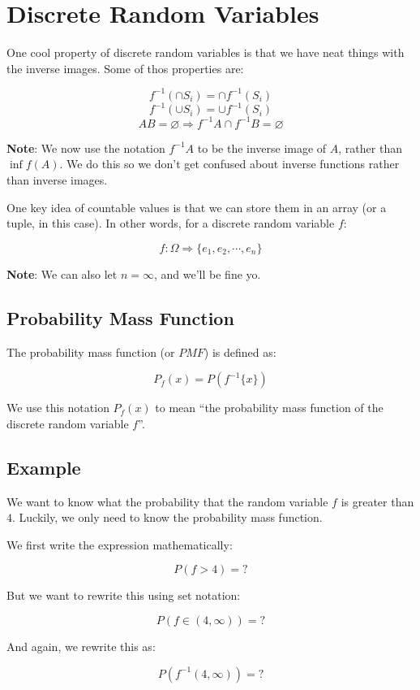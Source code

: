 \documentclass{article}
\newcommand{\inv}[1]{#1^{-1}}
\begin{document}
\section*{Discrete Random Variables}

One cool property of discrete random variables is that we have neat
things with the inverse images. Some of thos properties are:

\[
f^{-1}(\cap S_i)=\cap f^{-1}(S_i)
\] \[
f^{-1}(\cup S_i)=\cup f^{-1}(S_i)
\] \[
AB=\varnothing \Rightarrow f^{-1}A\cap\inv{f}B=\varnothing
\]

\textbf{Note}: We now use the notation $\inv{f}A$ to be the inverse
image of $A$, rather than $\inf{f}(A)$. We do this so we don't get
confused about inverse functions rather than inverse images.

One key idea of countable values is that we can store them in an array
(or a tuple, in this case). In other words, for a discrete random
variable $f$:

\[
f:\Omega\Rightarrow\{e_1,e_2,\cdots,e_n\}
\]

\textbf{Note}: We can also let $n=\infty$, and we'll be fine yo.

\subsection*{Probability Mass Function}

The probability mass function (or $PMF$) is defined as:

\[
P_f(x)=P(\inv{f}\{x\})
\]

We use this notation $P_f(x)$ to mean ``the probability mass function
of the discrete random variable $f$''.

\subsection*{Example}

We want to know what the probability that the random variable $f$ is
greater than $4$. Luckily, we only need to know the probability mass
function.

We first write the expression mathematically:

\[
P(f>4)=?
\]

But we want to rewrite this using set notation:

\[
P(f\in(4,\infty))=?
\]

And again, we rewrite this as:

\[
P(\inv{f}(4,\infty))=?
\]
\end{document}
